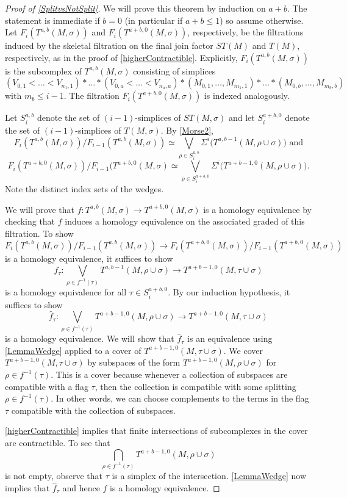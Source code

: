 \documentclass[a4paper]{amsart}
\newcommand{\m}{\to}
\numberwithin{theoremcounter}{section}
\theoremstyle{definition}
\theoremstyle{remark}
\begin{document}
\begin{proof}[Proof of \autoref{SplitvsNotSplit}]
We will prove this theorem by induction on $a+b$. The statement is immediate if $b=0$ (in particular if $a+b \leq 1$) so assume otherwise.  Let $F_i(T^{a,b}(M,\sigma) )$ and $F_i(T^{a+b,0}(M,\sigma) )$, respectively, be the filtrations induced by the skeletal filtration on the final join factor $ST(M)$ and $T(M)$, respectively, as in the proof of \autoref{higherContractible}. Explicitly, $F_i(T^{a,b}(M,\sigma) )$ is the subcomplex of $T^{a,b}(M,\sigma)$ consisting of simplices
$$ (V_{0,1} < \dots< V_{n_1,1}  ) * \dots * (V_{0,a} < \dots< V_{n_a,a}  ) * (M_{0,1},\dots,M_{m_1,1}  ) * \dots * (M_{0,b},\dots,M_{m_b,b}  ) $$
with $m_b \leq i-1$. The filtration $F_i(T^{a+b,0}(M,\sigma) )$ is indexed analogously. 


Let $S_i^{a,b}$ denote the set of $(i-1)$-simplices of $ST(M,\sigma)$ and let $S_i^{a+b,0}$ denote the set of $(i-1)$-simplices of $T(M,\sigma)$. By \autoref{Morse2},
$$F_i( T^{a,b}(M,\sigma)  )/ F_{i-1}( T^{a,b}(M,\sigma)  ) \simeq \bigvee_{\rho \in S_i^{a,b}} \Sigma^{i} \Big( T^{a,b-1}(M,\rho \cup \sigma) \Big)  \text{ and}$$
$$ F_i( T^{a+b,0}(M,\sigma)  )/ F_{i-1}( T^{a+b,0}(M,\sigma) \simeq \bigvee_{\rho \in S_i^{a+b,0}} \Sigma^{i} \Big( T^{a+b-1,0}(M,\rho \cup \sigma)\Big).$$ Note the distinct index sets of the wedges. 

We will prove that $f\colon T^{a,b}(M, \sigma) \m T^{a+b,0}(M, \sigma)$ is a homology equivalence by checking that $f$ induces a homology equivalence on the associated graded of this filtration.  To show $$ F_i( T^{a,b}(M,\sigma)  )/ F_{i-1}( T^{a,b}(M,\sigma)  ) \m F_i( T^{a+b,0}(M,\sigma)  )/ F_{i-1}( T^{a+b,0}(M,\sigma))$$ is a homology equivalence, it suffices to show  $$ f_{\tau}\colon  \bigvee_{\rho \in f^{-1}(\tau)} T^{a,b-1}(M,\rho \cup \sigma) \m T^{a+b-1,0}(M,\tau \cup \sigma) $$ is a homology equivalence for all $\tau \in S_i^{a+b,0}$. By our induction hypothesis, it suffices to show $$ \hat{f}_{\tau}\colon  \bigvee_{\rho \in f^{-1}(\tau)} T^{a+b-1,0}(M,\rho \cup \sigma) \m T^{a+b-1,0}(M,\tau \cup \sigma) $$ is a homology equivalence. We will show that $\hat{f}_{\tau}$ is an equivalence using \autoref{LemmaWedge} applied to a cover of $T^{a+b-1,0}(M,\tau \cup \sigma)$. We cover $T^{a+b-1,0}(M,\tau \cup \sigma)$ by subspaces of the form $T^{a+b-1,0}(M,\rho \cup \sigma) $ for $\rho \in f^{-1}(\tau)$. This is a cover because whenever a collection of subspaces are compatible with a flag $\tau$, then the collection is compatible with some splitting $\rho \in f^{-1}(\tau)$. In other words, we can choose complements to the terms in the flag $\tau$ compatible with the collection of subspaces. 


\autoref{higherContractible} implies that finite intersections of subcomplexes in the cover are contractible. To see that $$ \bigcap_{\rho \in f^{-1}(\tau)}  T^{a+b-1,0}(M,\rho \cup \sigma)   $$ is not empty, observe that $\tau$ is a simplex of the intersection. \autoref{LemmaWedge} now implies that $\hat{f}_{\tau}$ and hence $f$ is a homology equivalence. 
%
%
\end{proof}
\end{document}
